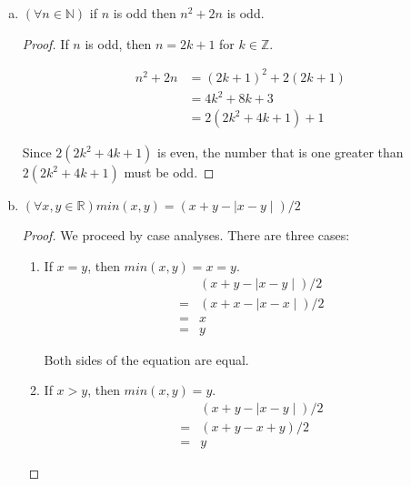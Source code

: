 \documentclass{article}
\begin{document}
\begin{enumerate}[(a)]
    \item $(\forall n \in \mathbb{N})$ if $n$ is odd then $n^2 + 2n$ is odd.
    
    \begin{proof}
    If $n$ is odd, then $n = 2k + 1$ for $k \in \mathbb{Z}$.
    
    \begin{equation*}
        \begin{split}
            n^2 + 2n & = (2k + 1)^2 + 2(2k + 1) \\
                     & = 4k^2 + 8k + 3 \\
                     & = 2(2k^2 + 4k + 1) + 1
        \end{split}
    \end{equation*}
    
    Since $2(2k^2 + 4k + 1)$ is even, the number that is one greater than $2(2k^2 + 4k + 1)$ must be odd.
    \end{proof}
    
    \item $(\forall x, y \in \mathbb{R}) min(x, y) = (x + y - \mid x - y \mid) / 2$
    
    \begin{proof}
    We proceed by case analyses. There are three cases:
    \begin{enumerate}[(1)]
        \item If $x = y$, then $min(x, y) = x = y$.
        \begin{equation*}
            \begin{split}
                & (x + y - \mid x - y \mid) / 2 \\
                = & (x + x - \mid x - x \mid) / 2 \\
                = & x \\
                = & y
            \end{split}
        \end{equation*}
        
        Both sides of the equation are equal.
        
        \item If $x > y$, then $min(x, y) = y$.
        \begin{equation*}
            \begin{split}
                & (x + y - \mid x - y \mid) / 2 \\
                = & (x + y - x + y) / 2 \\
                = & y
            \end{split}
        \end{equation*}
        

\end{enumerate}
\end{proof}
\end{enumerate}
\end{document}
